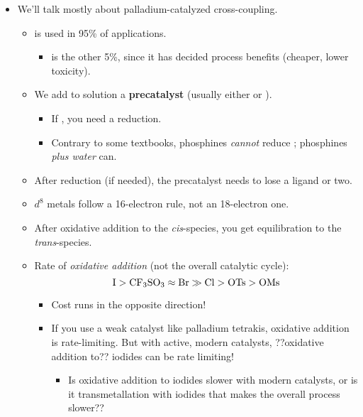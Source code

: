\documentclass[../notes.tex]{subfiles}
\begin{document}
\begin{itemize}
\begin{itemize}
    \end{itemize}
    \item We'll talk mostly about palladium-catalyzed cross-coupling.
    \begin{itemize}
        \item {} is used in 95\% of applications.
        \begin{itemize}
            \item {} is the other 5\%, since it has decided process benefits (cheaper, lower toxicity).
        \end{itemize}
        \item We add to solution a \textbf{precatalyst} (usually either  or ).
        \begin{itemize}
            \item If , you need a reduction.
            \item Contrary to some textbooks, phosphines \emph{cannot} reduce ; phosphines \emph{plus water} can.
        \end{itemize}
        \item After reduction (if needed), the precatalyst needs to lose a ligand or two.
        \item $d^8$ metals follow a 16-electron rule, not an 18-electron one.
        \item After oxidative addition to the \emph{cis}-species, you get equilibration to the \emph{trans}-species.
        \item Rate of \emph{oxidative addition} (not the overall catalytic cycle):
        \begin{equation*}
            \ce{I} > \ce{CF3SO3} \approx \ce{Br} \gg \ce{Cl} > \ce{OTs} > \ce{OMs}
        \end{equation*}
        \begin{itemize}
            \item Cost runs in the opposite direction!
            \item If you use a weak catalyst like palladium tetrakis, oxidative addition is rate-limiting. But with active, modern catalysts, ??oxidative addition to?? iodides can be rate limiting!
            \begin{itemize}
                \item Is oxidative addition to iodides slower with modern catalysts, or is it transmetallation with iodides that makes the overall process slower??
            \end{itemize}

\end{itemize}
\end{itemize}
\end{itemize}
\end{document}

